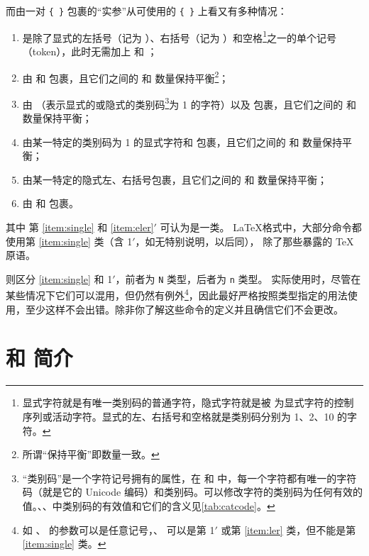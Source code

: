 \documentclass[openany]{book}
\begin{document}
而由一对 \verb|{ }| 包裹的“实参”从可使用的 \verb|{ }| 上看又有多种情况：
\begin{enumerate}
  \item\label{item:single} 是除了显式的左括号（记为 ）、右括号（记为 ）和空格\footnote{显式字符就是有唯一类别码的普通字符，隐式字符就是被  为显式字符的控制序列或活动字符。显式的左、右括号和空格就是类别码分别为 1、2、10 的字符。}之一的单个记号（token），此时无需加上  和 ；
  \item[1$'$.]\label{item:eler} 由  和  包裹，且它们之间的  和  数量保持平衡\footnote{所谓“保持平衡”即数量一致。}；
  \item\label{item:ler} 由 \BNFT{\{} （表示显式的或隐式的类别码\footnote{“类别码”是一个字符记号拥有的属性，在 \XeTeX 和 \LuaTeX 中，每一个字符都有唯一的字符码（就是它的 Unicode 编码）和类别码。可以修改字符的类别码为任何有效的值。\pdfTeX、\XeTeX、\LuaTeX 中类别码的有效值和它们的含义见\cref{tab:catcode}。}为 1 的字符）以及  包裹，且它们之间的  和  数量保持平衡；
  \item\label{item:sler} 由某一特定的类别码为 1 的显式字符和  包裹，且它们之间的  和  数量保持平衡；
  \item\label{item:silsir} 由某一特定的隐式左、右括号包裹，且它们之间的  和  数量保持平衡；
  \item\label{item:lr} 由 \BNFT{\{} 和 \BNFT{\}} 包裹。
\end{enumerate}
其中 第 \ref{item:single} 和 \ref{item:eler}$'$ 可认为是一类。
\LaTeX 格式中，大部分命令都使用第 \ref{item:single} 类（含 1$'$，如无特别说明，以后同），
除了那些暴露的 \TeX 原语。

\LaTeXiii 则区分 \ref{item:single} 和 1$'$，前者为 \texttt N 类型，后者为 \texttt n 类型。
实际使用时，尽管在某些情况下它们可以混用，但仍然有例外\footnote{如 、 的参数可以是任意记号，、 可以是第 1$'$ 或第 \ref{item:ler} 类，但不能是第 \ref{item:single} 类。}，因此最好严格按照类型指定的用法使用，至少这样不会出错。除非你了解这些命令的定义并且确信它们不会更改。

\section{ 和  简介}
\end{document}
